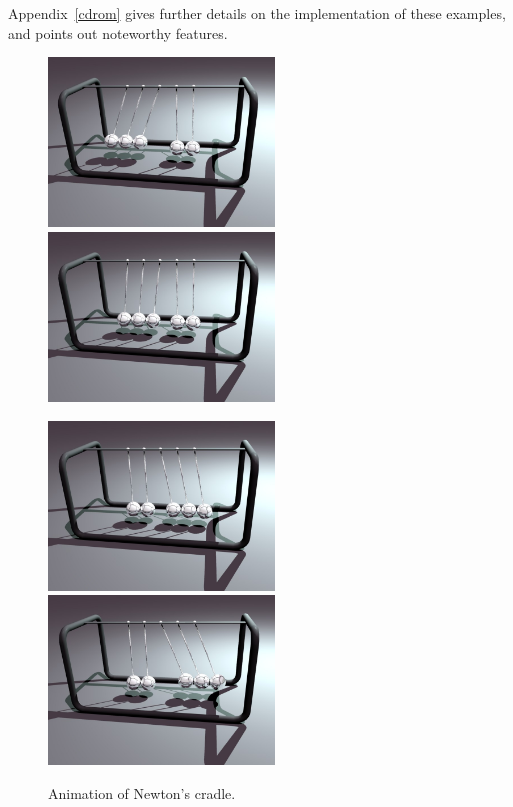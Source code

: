 Appendix~\ref{cdrom} gives further details on the implementation of these examples, and points
out noteworthy features.

\begin{figure}[p]
\centerline{\includegraphics[width=60mm,height=45mm]{figures/cradle1} \hspace{5mm}
            \includegraphics[width=60mm,height=45mm]{figures/cradle2}}\vspace{5mm}
\centerline{\includegraphics[width=60mm,height=45mm]{figures/cradle3} \hspace{5mm}
            \includegraphics[width=60mm,height=45mm]{figures/cradle4}}
\caption{Animation of Newton's cradle.\label{sampleCradle}}
\end{figure}

